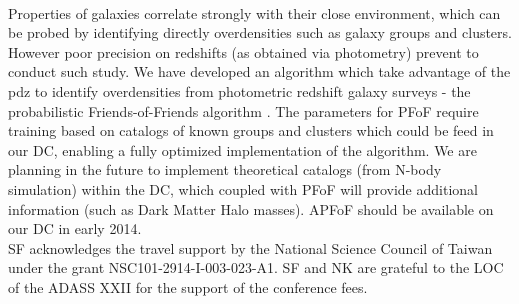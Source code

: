 \documentclass[11pt,twoside]{article}
\begin{document}
\\
Properties of galaxies correlate strongly with their close environment, which can be probed by identifying directly overdensities such as galaxy groups and clusters. However poor precision on redshifts (as obtained via photometry) prevent to conduct such study. We have developed an algorithm which take advantage of the pdz to identify overdensities from photometric redshift galaxy surveys - the probabilistic Friends-of-Friends algorithm \citep[PFoF -][]{pfof}. The parameters for PFoF require training based on catalogs of known groups and clusters which could be feed in our DC, enabling a fully optimized implementation of the algorithm. We are planning in the future to implement theoretical catalogs (from N-body simulation) within the DC, which coupled with PFoF will provide additional information (such as Dark Matter Halo masses). APFoF should be available on our DC in early 2014.\\


\acknowledgements SF acknowledges the travel support by the National Science Council of Taiwan under the grant NSC101-2914-I-003-023-A1. SF and NK are grateful to the LOC of the ADASS XXII for the support of the conference fees.


\end{document}
